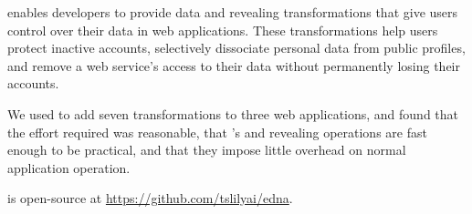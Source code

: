 %
\sys enables developers to provide data \xxing and revealing
transformations that give users control over their data in web applications.
%
These transformations help users protect inactive accounts, selectively dissociate
personal data from public profiles, and remove a web service's access to their
data without permanently losing their accounts.
%

%
We used \sys to add seven \xxing transformations to three web applications, and
found that the effort required was reasonable, that \sys's \xxing and
revealing operations are fast enough to be practical, and that they impose
little overhead on normal application operation.
%

%
\sys is open-source at \url{https://github.com/tslilyai/edna}.
%
